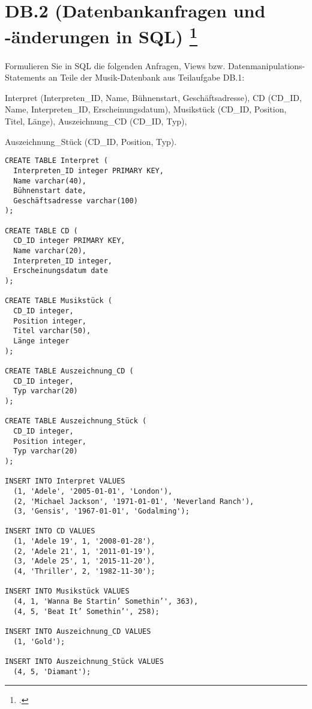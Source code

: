 \documentclass{lehramt-informatik-aufgabe}
\begin{document}
\section{DB.2 (Datenbankanfragen und -änderungen in SQL)
\footcite{66116:2015:03}}

Formulieren Sie in SQL die folgenden Anfragen, Views bzw.
Datenmanipulations-Statements an Teile der Musik-Datenbank aus
Teilaufgabe DB.1:

Interpret (Interpreten\_ID, Name, Bühnenstart, Geschäftsadresse),
CD (CD\_ID, Name, Interpreten\_ID, Erscheinungsdatum),
Musikstück (CD\_ID, Position, Titel, Länge),
Auszeichnung\_CD (CD\_ID, Typ),

Auszeichnung\_Stück (CD\_ID, Position, Typ).

\begin{verbatim}
CREATE TABLE Interpret (
  Interpreten_ID integer PRIMARY KEY,
  Name varchar(40),
  Bühnenstart date,
  Geschäftsadresse varchar(100)
);

CREATE TABLE CD (
  CD_ID integer PRIMARY KEY,
  Name varchar(20),
  Interpreten_ID integer,
  Erscheinungsdatum date
);

CREATE TABLE Musikstück (
  CD_ID integer,
  Position integer,
  Titel varchar(50),
  Länge integer
);

CREATE TABLE Auszeichnung_CD (
  CD_ID integer,
  Typ varchar(20)
);

CREATE TABLE Auszeichnung_Stück (
  CD_ID integer,
  Position integer,
  Typ varchar(20)
);

INSERT INTO Interpret VALUES
  (1, 'Adele', '2005-01-01', 'London'),
  (2, 'Michael Jackson', '1971-01-01', 'Neverland Ranch'),
  (3, 'Gensis', '1967-01-01', 'Godalming');

INSERT INTO CD VALUES
  (1, 'Adele 19', 1, '2008-01-28'),
  (2, 'Adele 21', 1, '2011-01-19'),
  (3, 'Adele 25', 1, '2015-11-20'),
  (4, 'Thriller', 2, '1982-11-30');

INSERT INTO Musikstück VALUES
  (4, 1, 'Wanna Be Startin’ Somethin’', 363),
  (4, 5, 'Beat It’ Somethin’', 258);

INSERT INTO Auszeichnung_CD VALUES
  (1, 'Gold');

INSERT INTO Auszeichnung_Stück VALUES
  (4, 5, 'Diamant');
\end{verbatim}
\end{document}
